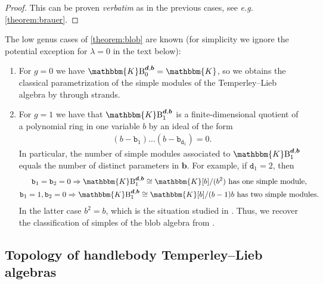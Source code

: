 \documentclass[a4paper,11pt]{amsart}
\newcommand{\eg}{\textsl{e.g.}}
\newcommand{\ver}{\textsl{verbatim}}
\renewcommand{\dots}{\text{...}}
\newcommand{\setstuff}[1]{\mathrm{#1}}
\newcommand{\KK}{\mathbbm{K}}
\newcommand{\bsym}[1]{\boldsymbol{#1}}
\newcommand{\varsym}[1]{\mathtt{#1}}
\newcommand{\bpar}{\bsym{b}}
\newcommand{\bvar}{\varsym{b}}
\newcommand{\dpar}{\bsym{d}}
\newcommand{\dvar}{\varsym{d}}
\numberwithin{equation}{section}
\let\fullref\autoref
\begin{document}
\begin{proof}
This can be proven {\ver} as in the previous cases, see {\eg} 
\fullref{theorem:brauer}.
\end{proof}

\begin{example}
The low genus cases of \fullref{theorem:blob} are known 
(for simplicity we ignore the potential exception 
for $\lambda=0$ in the text below):	

\begin{enumerate}

\item For $g=0$ we have $\KK\setstuff{B}_{0}^{\dpar,\bpar}=\KK$, so we obtains 
the classical parametrization of the simple modules of 
the Temperley--Lieb algebra by through strands.

\item For $g=1$ we have that $\KK\setstuff{B}_{1}^{\dpar,\bpar}$ is 
a finite-dimensional quotient of a polynomial ring in one variable $b$
by an ideal of the form
\begin{gather*}
(b-\bvar_{1})
\dots
(b-\bvar_{\dvar_{1}})=0.
\end{gather*} 
In particular, the number of simple modules associated to 
$\KK\setstuff{B}_{1}^{\dpar,\bpar}$ equals the number of distinct 
parameters in $\bpar$. For example, if $\dvar_{1}=2$, then
\begin{gather*}
\bvar_{1}=\bvar_{2}=0\Rightarrow
\KK\setstuff{B}_{1}^{\dpar,\bpar}\cong\KK[b]/(b^{2})
\text{ has one simple module},
\\
\bvar_{1}=1,\bvar_{2}=0\Rightarrow
\KK\setstuff{B}_{1}^{\dpar,\bpar}\cong\KK[b]/(b-1)b
\text{ has two simple modules}.
\end{gather*}
In the latter case $b^{2}=b$, 
which is the situation studied in \cite{MaSa-blob}.
Thus, we recover the classification of simples of the blob 
algebra from \cite{MaSa-blob}.
\end{enumerate}

\end{example}

\subsection{Topology of handlebody Temperley--Lieb algebras}\label{subsection:handlebody-tl-topology}
\end{document}

